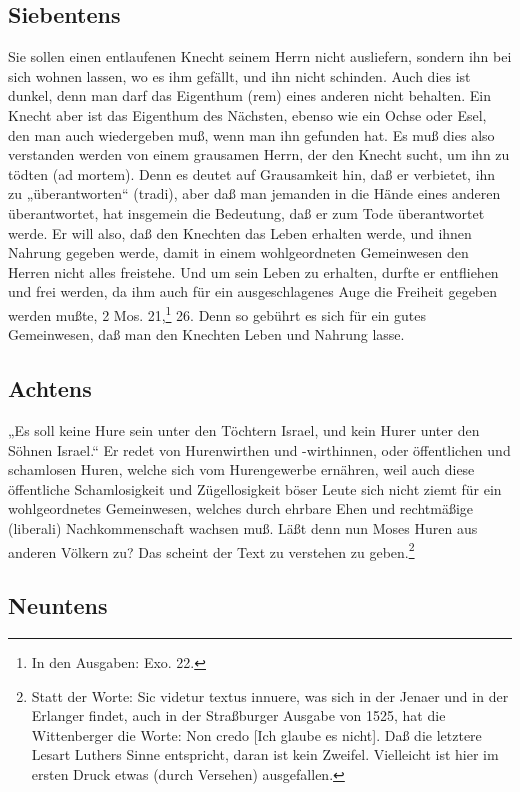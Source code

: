\subsection{Siebentens}

Sie sollen einen entlaufenen Knecht seinem Herrn nicht ausliefern, sondern ihn bei sich wohnen lassen, wo es ihm gefällt, und ihn nicht schinden. Auch dies ist dunkel, denn man darf das Eigenthum (rem) eines anderen nicht behalten. Ein Knecht aber ist das Eigenthum des Nächsten, ebenso wie ein Ochse oder Esel, den man auch wiedergeben muß, wenn man ihn gefunden hat. Es muß dies also verstanden werden von einem grausamen Herrn, der den Knecht sucht, um ihn zu tödten (ad mortem). Denn es deutet auf Grausamkeit hin, daß er verbietet, ihn zu „überantworten“ (tradi), aber daß man jemanden in die Hände eines anderen überantwortet, hat insgemein die Bedeutung, daß er zum Tode überantwortet werde. Er will also, daß den Knechten das Leben erhalten werde, und ihnen Nahrung gegeben werde, damit in einem wohlgeordneten Gemeinwesen den Herren nicht alles freistehe. Und um sein Leben zu erhalten, durfte er entfliehen und frei werden, da ihm auch für ein ausgeschlagenes Auge die Freiheit gegeben werden mußte, 2 Mos. 21,\footnote{In den Ausgaben: Exo. 22.} 26. Denn so gebührt es sich für ein gutes Gemeinwesen, daß man den Knechten Leben und Nahrung lasse.

\subsection{Achtens}

„Es soll keine Hure sein unter den Töchtern Israel, und kein Hurer unter den Söhnen Israel.“ Er redet von Hurenwirthen und -wirthinnen, oder öffentlichen und schamlosen Huren, welche sich vom Hurengewerbe ernähren, weil auch diese öffentliche Schamlosigkeit und Zügellosigkeit böser Leute sich nicht ziemt für ein wohlgeordnetes Gemeinwesen, welches durch ehrbare Ehen und rechtmäßige (liberali) Nachkommenschaft wachsen muß. Läßt denn nun Moses Huren aus anderen Völkern zu? Das scheint der Text zu verstehen zu geben.\footnote{Statt der Worte: Sic videtur textus innuere, was sich in der Jenaer und in der Erlanger findet, auch in der Straßburger Ausgabe von 1525, hat die Wittenberger die Worte: Non credo [Ich glaube es nicht]. Daß die letztere Lesart Luthers Sinne entspricht, daran ist kein Zweifel. Vielleicht ist hier im ersten Druck etwas (durch Versehen) ausgefallen.}

\subsection{Neuntens}

